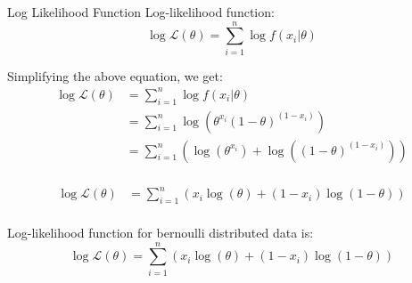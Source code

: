 \documentclass[handout]{beamer}
\begin{document}
    \begin{frame}{Log Likelihood Function}
        Log-likelihood function:
        \begin{equation}
            \log \mathcal{L}(\theta) = \sum_{i=1}^n \log f(x_i|\theta)
        \end{equation}
    
        Simplifying the above equation, we get:
        \begin{align*}
            \log \mathcal{L}(\theta) &= \sum_{i=1}^n \log f(x_i|\theta) \\
            &= \sum_{i=1}^n \log \left (\theta^{x_{i}}(1-\theta)^{(1-x_{i})} \right) \\
            &= \sum_{i=1}^n \left( \log \left( \theta^{x_{i}} \right) + \log \left( (1-\theta)^{(1-x_{i})}  \right) \right) \\
            \end{align*}
    \end{frame}
    \begin{frame}
       
        \begin{align*}
            \log \mathcal{L}(\theta) &= \sum_{i=1}^n \left (x_{i}\log \left( \theta \right) + (1-x_{i})\log \left(1-\theta \right) \right)\\
            \end{align*}
            \begin{tcolorbox}[colback=metropolisblue!5,colframe=metropolisblue,title=Log Likelihood Function for Bernoulli Distribution]
                Log-likelihood function for bernoulli distributed data is:
                \[
                    \log \mathcal{L}(\theta) = \sum_{i=1}^n  (x_{i}\log(\theta) + (1-x_{i})\log(1-\theta))
                    \]
            \end{tcolorbox}
    \end{frame}
    
\end{document}
